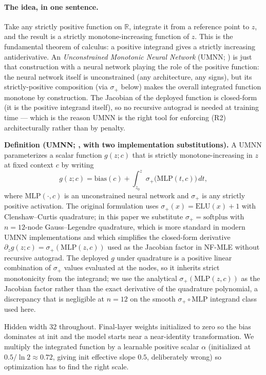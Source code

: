 \documentclass[11pt]{article}
\begin{document}
\paragraph{The idea, in one sentence.}
Take any strictly positive function on \(\mathbb{R}\), integrate it
from a reference point to \(z\), and the result is a strictly
monotone-increasing function of \(z\). This is the fundamental theorem
of calculus: a positive integrand gives a strictly increasing
antiderivative. An \emph{Unconstrained Monotonic Neural Network}
(UMNN; \citealp{WehenkelLouppe2019}) is just that construction with a
neural network playing the role of the positive function: the neural
network itself is unconstrained (any architecture, any signs), but
its strictly-positive composition (via \(\sigma_+\) below) makes the
overall integrated function monotone by construction. The Jacobian of
the deployed function is closed-form (it is the positive integrand
itself), so no recursive autograd is needed at training time --- which
is the reason UMNN is the right tool for enforcing (R2)
architecturally rather than by penalty.

\textbf{Definition (UMNN; \citealp{WehenkelLouppe2019}, with two
implementation substitutions).} A UMNN parameterizes a scalar function
\(g(z; c)\) that is strictly monotone-increasing in \(z\) at fixed
context \(c\) by writing \[
g(z; c) = \mathrm{bias}(c) + \int_{z_0}^z \sigma_+\bigl(\mathrm{MLP}(t, c)\bigr)\, dt,
\] where \(\mathrm{MLP}(\cdot, c)\) is an unconstrained neural network
and \(\sigma_+\) is any strictly positive activation. The original
formulation \citep{WehenkelLouppe2019} uses
\(\sigma_+(x) = \mathrm{ELU}(x) + 1\) with Clenshaw--Curtis quadrature;
in this paper we substitute \(\sigma_+ = \mathrm{softplus}\) with
\(n = 12\)-node Gauss--Legendre quadrature, which is more standard in
modern UMNN implementations and which simplifies the closed-form
derivative \(\partial_z g(z; c) = \sigma_+(\mathrm{MLP}(z, c))\) used
as the Jacobian factor in NF-MLE without recursive autograd. The deployed \(g\) under quadrature is a positive
linear combination of \(\sigma_+\) values evaluated at the nodes, so it
inherits strict monotonicity from the integrand; we use the analytical
\(\sigma_+(\mathrm{MLP}(z, c))\) as the Jacobian factor rather than the
exact derivative of the quadrature polynomial, a discrepancy that is
negligible at \(n = 12\) on the smooth \(\sigma_+ \circ \mathrm{MLP}\)
integrand class used here.

Hidden width 32 throughout. Final-layer weights initialized to zero so
the bias dominates at init and the model starts near a near-identity
transformation. We multiply the integrated function by a learnable
positive scalar \(\alpha\) (initialized at \(0.5 / \ln 2 \approx 0.72\),
giving init effective slope \(0.5\), deliberately wrong) so optimization
has to find the right scale.
\end{document}

